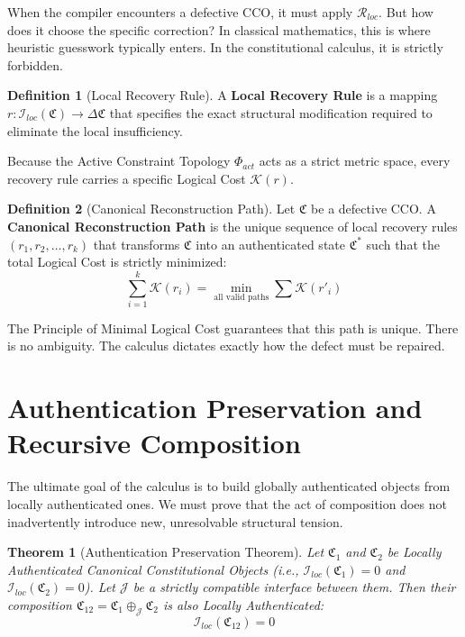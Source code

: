 \documentclass[12pt,openany]{extbook}
\theoremstyle{plain}
\newtheorem{theorem}{Theorem}[chapter]
\theoremstyle{definition}
\newtheorem{definition}{Definition}[chapter]
\begin{document}
When the compiler encounters a defective CCO, it must apply $\mathcal{R}_{loc}$. But how does it choose the specific correction? In classical mathematics, this is where heuristic guesswork typically enters. In the constitutional calculus, it is strictly forbidden.

\begin{definition}[Local Recovery Rule]
A \textbf{Local Recovery Rule} is a mapping $r: \mathcal{I}_{loc}(\mathfrak{C}) \to \Delta \mathfrak{C}$ that specifies the exact structural modification required to eliminate the local insufficiency. 
\end{definition}

Because the Active Constraint Topology $\Phi_{act}$ acts as a strict metric space, every recovery rule carries a specific Logical Cost $\mathcal{K}(r)$. 

\begin{definition}[Canonical Reconstruction Path]
Let $\mathfrak{C}$ be a defective CCO. A \textbf{Canonical Reconstruction Path} is the unique sequence of local recovery rules $(r_1, r_2, \dots, r_k)$ that transforms $\mathfrak{C}$ into an authenticated state $\mathfrak{C}^*$ such that the total Logical Cost is strictly minimized:
\[
\sum_{i=1}^k \mathcal{K}(r_i) = \min_{\text{all valid paths}} \sum \mathcal{K}(r'_i)
\]
\end{definition}

The Principle of Minimal Logical Cost guarantees that this path is unique. There is no ambiguity. The calculus dictates exactly how the defect must be repaired.

\section{Authentication Preservation and Recursive Composition}

The ultimate goal of the calculus is to build globally authenticated objects from locally authenticated ones. We must prove that the act of composition does not inadvertently introduce new, unresolvable structural tension.

\begin{theorem}[Authentication Preservation Theorem]
Let $\mathfrak{C}_1$ and $\mathfrak{C}_2$ be Locally Authenticated Canonical Constitutional Objects (i.e., $\mathcal{I}_{loc}(\mathfrak{C}_1) = 0$ and $\mathcal{I}_{loc}(\mathfrak{C}_2) = 0$). Let $\mathcal{J}$ be a strictly compatible interface between them. Then their composition $\mathfrak{C}_{12} = \mathfrak{C}_1 \oplus_{\mathcal{J}} \mathfrak{C}_2$ is also Locally Authenticated:
\[
\mathcal{I}_{loc}(\mathfrak{C}_{12}) = 0
\]
\end{theorem}
\end{document}
